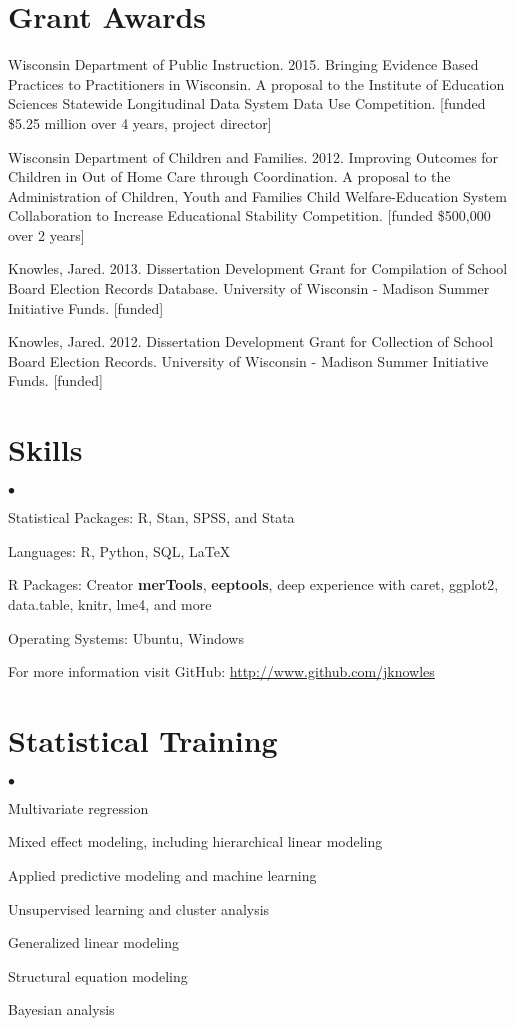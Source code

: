 \documentclass[margin,line]{res}
\newenvironment{list2}{
  \begin{list}{$\bullet$}{%
      \setlength{\itemsep}{0in}
      \setlength{\parsep}{0in} \setlength{\parskip}{0in}
      \setlength{\topsep}{0in} \setlength{\partopsep}{0in} 
      \setlength{\leftmargin}{0.2in}}}{\end{list}}
\begin{document}
\begin{resume}
\section{\sc Grant Awards}

Wisconsin Department of Public Instruction. 2015. Bringing Evidence Based 
Practices to Practitioners in Wisconsin. A proposal to the Institute of Education 
Sciences Statewide Longitudinal Data System Data Use Competition.  
[funded \$5.25 million over 4 years, project director]

Wisconsin Department of Children and Families. 2012. Improving Outcomes for Children in Out of Home Care through Coordination. A proposal to the Administration of Children, Youth and Families 
 Child Welfare-Education System Collaboration to Increase Educational Stability Competition. [funded \$500,000 over 2 years]

Knowles, Jared. 2013. Dissertation Development Grant for Compilation of School Board Election Records Database. University of Wisconsin - Madison Summer Initiative Funds. [funded]

Knowles, Jared. 2012. Dissertation Development Grant for Collection of School Board Election Records. University of Wisconsin - Madison Summer Initiative Funds. [funded]

\section{\sc Skills} 
\begin{list2}
\item Statistical Packages:  R, Stan, SPSS, and Stata
\item Languages:  R, Python, SQL, \LaTeX
\item R Packages: Creator \textbf{merTools}, \textbf{eeptools}, deep experience with caret, ggplot2, data.table, knitr, lme4, and more
\item Operating Systems:  Ubuntu, Windows
\item For more information visit GitHub: \url{http://www.github.com/jknowles}\\
\end{list2}

\section{\sc Statistical Training}
\begin{list2}
\item Multivariate regression
\item Mixed effect modeling, including hierarchical linear modeling
\item Applied predictive modeling and machine learning
\item Unsupervised learning and cluster analysis
\item Generalized linear modeling
\item Structural equation modeling
\item Bayesian analysis
\end{list2}


\end{resume}
\end{document}
